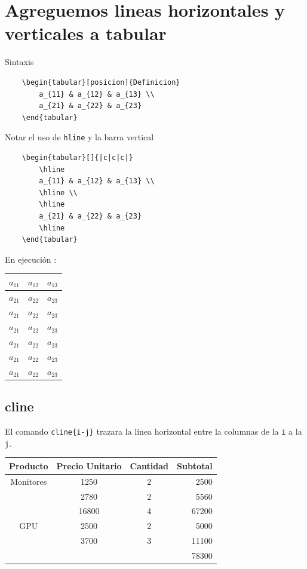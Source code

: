 \documentclass[]{article}
\begin{document}
\section{Agreguemos lineas horizontales y verticales a tabular}


\noindent Sintaxis

\begin{verbatim}
	\begin{tabular}[posicion]{Definicion}
		a_{11} & a_{12} & a_{13} \\
		a_{21} & a_{22} & a_{23}
	\end{tabular}
\end{verbatim}

Notar el uso de \verb*|hline| y la barra vertical 


\begin{verbatim}
	\begin{tabular}[]{|c|c|c|}
		\hline
		a_{11} & a_{12} & a_{13} \\
		\hline \\
		\hline
		a_{21} & a_{22} & a_{23}
		\hline
	\end{tabular}
\end{verbatim}

En ejecución :

\begin{center}
	\begin{tabular}[]{|c|c|c|}
	\hline
	$a_{11}$ & $a_{12}$ & $a_{13}$ \\
	\hline
	$a_{21}$ & $a_{22}$ & $a_{23}$\\
	\hline
	$a_{21}$ & $a_{22}$ & $a_{23}$\\
	\hline
	$a_{21}$ & $a_{22}$ & $a_{23}$\\
	\hline
	$a_{21}$ & $a_{22}$ & $a_{23}$\\
	\hline
	$a_{21}$ & $a_{22}$ & $a_{23}$\\
	\hline
	$a_{21}$ & $a_{22}$ & $a_{23}$\\
	\hline	
\end{tabular}
\end{center}



\subsection{cline}
El comando \verb*|cline{i-j}| trazara la linea 
horizontal entre la columnas de la \verb*|i|
a la \verb*|j|.
\begin{center}
\begin{tabular}{cccr}
\hline
Producto & Precio Unitario & Cantidad & Subtotal \\
\hline
Monitores & 1250 & 2 & 2500\\
		  & 2780 & 2 & 5560 \\
		  & 16800 & 4 & 67200 \\
\hline
GPU	 	  & 2500 & 2 & 5000\\
          & 3700 & 3 & 11100\\
          \cline{4-4}
          &      &   & 78300

\end{tabular}
\end{center}
\end{document}
